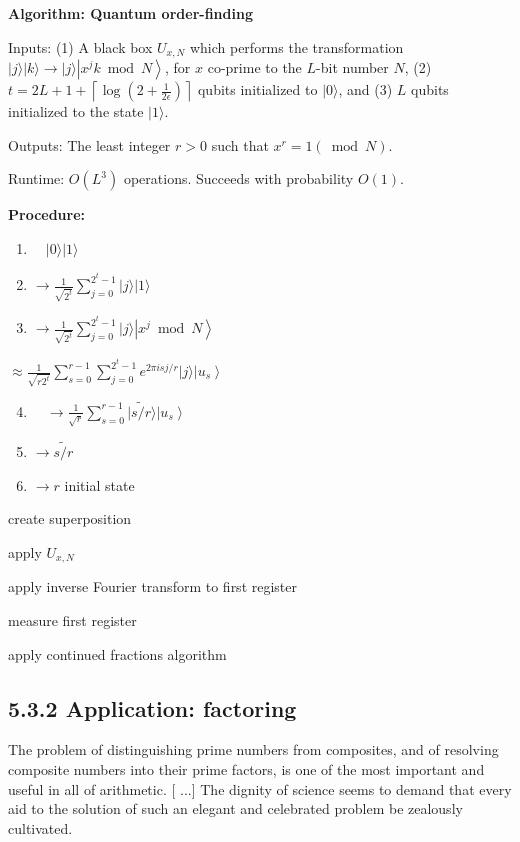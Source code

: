 \textbf{Algorithm: Quantum order-finding}

Inputs: (1) A black box $U_{x, N}$ which performs the transformation $|j\rangle|k\rangle \rightarrow|j\rangle\left|x^{j} k \bmod N\right\rangle$, for $x$ co-prime to the $L$-bit number $N$, (2) $t=2 L+1+\left\lceil\log \left(2+\frac{1}{2 \epsilon}\right)\right\rceil$ qubits initialized to $|0\rangle$, and (3) $L$ qubits initialized to the state $|1\rangle$.

Outputs: The least integer $r>0$ such that $x^{r}=1(\bmod N)$.

Runtime: $O\left(L^{3}\right)$ operations. Succeeds with probability $O(1)$.

\textbf{Procedure:}
\begin{enumerate}
  \item $\quad|0\rangle|1\rangle$

  \item $\rightarrow \frac{1}{\sqrt{2^{t}}} \sum_{j=0}^{2^{t}-1}|j\rangle|1\rangle$

  \item $\rightarrow \frac{1}{\sqrt{2^{t}}} \sum_{j=0}^{2^{t}-1}|j\rangle\left|x^{j} \bmod N\right\rangle$

\end{enumerate}

$\approx \frac{1}{\sqrt{r 2^{t}}} \sum_{s=0}^{r-1} \sum_{j=0}^{2^{t}-1} e^{2 \pi i s j / r}|j\rangle\left|u_{s}\right\rangle$

\begin{enumerate}
  \setcounter{enumi}{3}
  \item $\quad \rightarrow \frac{1}{\sqrt{r}} \sum_{s=0}^{r-1}|\widetilde{s / r}\rangle\left|u_{s}\right\rangle$

  \item $\rightarrow \widetilde{s / r}$

  \item $\rightarrow r$ initial state

\end{enumerate}

create superposition

apply $U_{x, N}$

apply inverse Fourier transform to first register

measure first register

apply continued fractions algorithm

\subsection*{5.3.2 Application: factoring}
The problem of distinguishing prime numbers from composites, and of resolving composite numbers into their prime factors, is one of the most important and useful in all of arithmetic. [ ...] The dignity of science seems to demand that every aid to the solution of such an elegant and celebrated problem be zealously cultivated.


